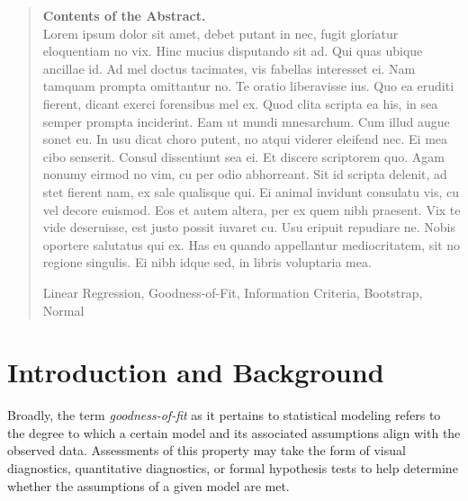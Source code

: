 \documentclass[12pt]{article} %
\renewcommand{\theequation}{\thesection\arabic{equation}}
\theoremstyle{definition}
\begin{document}
\begin{quotation}
{\bf Contents of the Abstract.}\\
Lorem ipsum dolor sit amet, debet putant in nec, fugit gloriatur eloquentiam no vix. Hinc mucius disputando sit ad. Qui quas ubique ancillae id. Ad mel doctus tacimates, vis fabellas interesset ei.
Nam tamquam prompta omittantur no. Te oratio liberavisse ius. Quo ea eruditi fierent, dicant exerci forensibus mel ex. Quod clita scripta ea his, in sea semper prompta inciderint. Eam ut mundi mnesarchum. Cum illud augue sonet eu.
In usu dicat choro putent, no atqui viderer eleifend nec. Ei mea cibo senserit. Consul dissentiunt sea ei. Et discere scriptorem quo. Agam nonumy eirmod no vim, cu per odio abhorreant.
Sit id scripta delenit, ad stet fierent nam, ex sale qualisque qui. Ei animal invidunt consulatu vis, cu vel decore euismod. Eos et autem altera, per ex quem nibh praesent. Vix te vide deseruisse, est justo possit iuvaret cu.
Usu eripuit repudiare ne. Nobis oportere salutatus qui ex. Has eu quando appellantur mediocritatem, sit no regione singulis. Ei nibh idque sed, in libris voluptaria mea.


\vspace{9pt}
Linear Regression, Goodness-of-Fit, Information Criteria, Bootstrap, Normal
\par
\end{quotation}\par



\def\thefigure{\arabic{figure}}
\def\thetable{\arabic{table}}

\renewcommand{\theequation}{\thesection.\arabic{equation}}


\fontsize{12}{14pt plus.8pt minus .6pt}\selectfont




\section{Introduction and Background}

    	Broadly, the term \textit{goodness-of-fit} as it pertains to statistical modeling refers to the degree to which a certain model
		and its associated assumptions align with the observed data. Assessments of this property may take the form of visual diagnostics, quantitative diagnostics, or formal hypothesis tests to help
		determine whether the assumptions of a given model are met.
\end{document}
